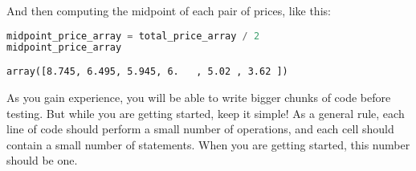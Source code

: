 And then computing the midpoint of each pair of prices, like this:

\begin{lstlisting}[language=Python,style=source]
midpoint_price_array = total_price_array / 2
midpoint_price_array
\end{lstlisting}

\begin{lstlisting}[style=output]
array([8.745, 6.495, 5.945, 6.   , 5.02 , 3.62 ])
\end{lstlisting}

As you gain experience, you will be able to write bigger chunks of code
before testing. But while you are getting started, keep it simple! As a
general rule, each line of code should perform a small number of
operations, and each cell should contain a small number of statements.
When you are getting started, this number should be one.

